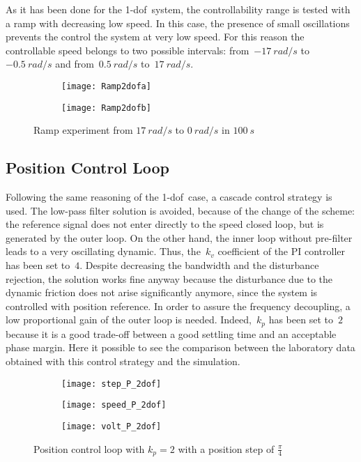As it has been done for the \acrshort{1-dof}\ system, the controllability range is tested with a ramp with decreasing low speed. In this case, the presence of small oscillations prevents the control the system at very low speed. For this reason the controllable speed belongs to two possible intervals: from~$-17\ rad/s$ to~$-0.5\ rad/s$ and from~$0.5\ rad/s$ to~$17\ rad/s$.
\begin{figure*}[h]
	\centering
	\begin{subfigure}{0.45\columnwidth}
		\texttt{[image: Ramp2dofa]}
	\end{subfigure}
	\begin{subfigure}{0.45\columnwidth}
		\texttt{[image: Ramp2dofb]}
	\end{subfigure}

	\caption{Ramp experiment from $17\ rad/s$ to $0\ rad/s$ in $100\ s$}
	\label{fig:Ramp2dof}
\end{figure*}

\newpage
\subsection{Position Control Loop}

Following the same reasoning of the \acrshort{1-dof}~case, a cascade control strategy is used. The low-pass filter solution is avoided, because of the change of the scheme: the reference signal does not enter directly to the speed closed loop, but is generated by the outer loop. On the other hand, the inner loop without pre-filter leads to a very oscillating dynamic. Thus, the~$k_v$ coefficient of the PI controller has been set to~$4$. Despite decreasing the bandwidth and the disturbance rejection, the solution works fine anyway because the disturbance due to the dynamic friction does not arise significantly anymore, since the system is controlled with position reference.
In order to assure the frequency decoupling, a low proportional gain of the outer loop is needed. Indeed,~$k_p$ has been set to~$2$ because it is a good trade-off between a good settling time and an acceptable phase margin.
\newline
Here it possible to see the comparison between the laboratory data obtained with this control strategy and the simulation.
\begin{figure*}[h]
	\centering
	\begin{subfigure}{0.48\columnwidth}
		\texttt{[image: step\_P\_2dof]}
	\end{subfigure}
	\begin{subfigure}{0.45\columnwidth}
		\texttt{[image: speed\_P\_2dof]}
	\end{subfigure}
	\begin{subfigure}{0.45\columnwidth}
		\texttt{[image: volt\_P\_2dof]}
	\end{subfigure}
	\caption{Position control loop with $k_{p} =2$ with a position step of $\frac{\pi}{4}$}
	\label{fig:P_2dof}
\end{figure*}

